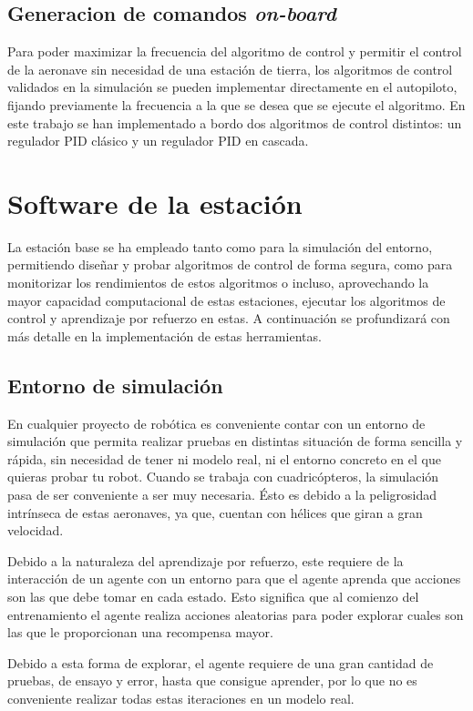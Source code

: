 \subsection{Generacion de comandos \textit{on-board}}
	Para poder maximizar la frecuencia del algoritmo de control y permitir el control de la aeronave sin necesidad de una estación de tierra, los algoritmos de control validados en la simulación se pueden implementar directamente en el autopiloto, fijando previamente la frecuencia a la que se desea que se ejecute el algoritmo. 
	En este trabajo se han implementado a bordo dos algoritmos de control distintos: un regulador PID clásico y un regulador PID en cascada.
	
\section{Software de la estación}

La estación base se ha empleado tanto como para la simulación del entorno, permitiendo diseñar y probar algoritmos de control de forma segura, como para monitorizar los rendimientos de estos algoritmos o incluso, aprovechando la mayor capacidad computacional de estas estaciones, ejecutar los algoritmos de control y aprendizaje por refuerzo en estas.
A continuación se profundizará con más detalle en la implementación de estas herramientas. 


\subsection{Entorno de simulación}

En cualquier proyecto de robótica es conveniente contar con un entorno de simulación que permita realizar pruebas en distintas situación de forma sencilla y rápida, sin necesidad de tener ni modelo real, ni el entorno concreto en el que quieras probar tu robot. Cuando se trabaja con cuadricópteros, la simulación pasa de ser conveniente a ser muy necesaria. Ésto es debido a la peligrosidad intrínseca de estas aeronaves, ya que, cuentan con hélices que giran a gran velocidad.


Debido a la naturaleza del aprendizaje por refuerzo, este requiere de la interacción de un agente con un entorno para que el agente aprenda que acciones son las que debe tomar en cada estado. Esto significa que al comienzo del entrenamiento el agente realiza acciones aleatorias para poder explorar cuales son las que le proporcionan una recompensa mayor.

Debido a esta forma de explorar, el agente requiere de una gran cantidad de pruebas, de ensayo y error, hasta que consigue aprender, por lo que no es conveniente realizar todas estas iteraciones en un modelo real.

